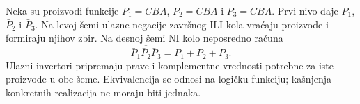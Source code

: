 Neka su proizvodi funkcije \(P_1=\bar CBA\), \(P_2=C\bar BA\) i \(P_3=CB\bar A\). Prvi nivo daje \(\bar P_1\), \(\bar P_2\) i \(\bar P_3\). Na levoj šemi ulazne negacije završnog ILI kola vraćaju proizvode i formiraju njihov zbir. Na desnoj šemi NI kolo neposredno računa
\[
\overline{\bar P_1\bar P_2\bar P_3}=P_1+P_2+P_3.
\]
Ulazni invertori pripremaju prave i komplementne vrednosti potrebne za iste proizvode u obe šeme. Ekvivalencija se odnosi na logičku funkciju; kašnjenja konkretnih realizacija ne moraju biti jednaka.
